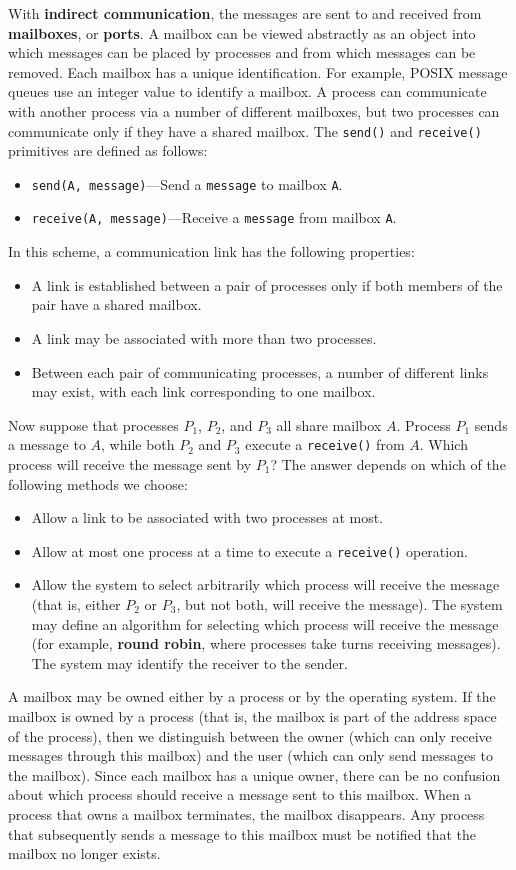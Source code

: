 With \textbf{indirect communication}, the messages are sent to and received from \textbf{mailboxes}, or \textbf{ports}. A mailbox can be viewed abstractly as an object into which messages can be placed by processes and from which messages can be removed. Each mailbox has a unique identification. For example, POSIX message queues use an integer value to identify a mailbox. A process can communicate with another process via a number of different mailboxes, but two processes can communicate only if they have a shared mailbox. The \texttt{send()} and \texttt{receive()} primitives are defined as follows:
\begin{itemize}
\item \texttt{send(A, message)}---Send a \texttt{message} to mailbox \texttt{A}.
\item \texttt{receive(A, message)}---Receive a \texttt{message} from mailbox \texttt{A}.
\end{itemize}
In this scheme, a communication link has the following properties:
\begin{itemize}
\item A link is established between a pair of processes only if both members of the pair have a shared mailbox.
\item A link may be associated with more than two processes.
\item Between each pair of communicating processes, a number of different links may exist, with each link corresponding to one mailbox.
\end{itemize}
Now suppose that processes $P_1$, $P_2$, and $P_3$ all share mailbox $A$. Process $P_1$ sends a message to $A$, while both $P_2$ and $P_3$ execute a \texttt{receive()} from $A$. Which process will receive the message sent by $P_1$? The answer depends on which of the following methods we choose:
\begin{itemize}
\item Allow a link to be associated with two processes at most.
\item Allow at most one process at a time to execute a \texttt{receive()} operation.
\item Allow the system to select arbitrarily which process will receive the message (that is, either $P_2$ or $P_3$, but not both, will receive the message). The system may define an algorithm for selecting which process will receive the message (for example, \textbf{round robin}, where processes take turns receiving messages). The system may identify the receiver to the sender.
\end{itemize}
A mailbox may be owned either by a process or by the operating system. If the mailbox is owned by a process (that is, the mailbox is part of the address space of the process), then we distinguish between the owner (which can only receive messages through this mailbox) and the user (which can only send messages to the mailbox). Since each mailbox has a unique owner, there can be no confusion about which process should receive a message sent to this mailbox. When a process that owns a mailbox terminates, the mailbox disappears. Any process that subsequently sends a message to this mailbox must be notified that the mailbox no longer exists.

